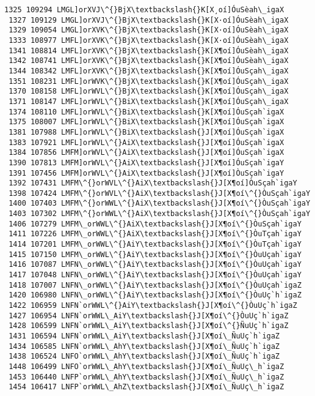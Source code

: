 \documentclass[11pt]{article}
\begin{document}
\begin{Verbatim}[commandchars=\\\{\}]
 1325 109294 LMGL]orXVJ\^{}BjX\textbackslash{}K[X¸oí]ÓuSèah\_igaX
 1327 109129 LMGL]orXVJ\^{}BjX\textbackslash{}K[X·oí]ÓuSèah\_igaX
 1329 109054 LMGL]orXVK\^{}BjX\textbackslash{}K[X·oí]ÓuSèah\_igaX
 1333 108977 LMFL]orXVK\^{}BjX\textbackslash{}K[X·oí]ÓuSèah\_igaX
 1341 108814 LMFL]orXVK\^{}BjX\textbackslash{}K[X¶oí]ÓuSèah\_igaX
 1342 108741 LMFL]orXVK\^{}BjX\textbackslash{}K[X¶oí]ÓuSèah\_igaX
 1344 108342 LMFL]orXVK\^{}BjX\textbackslash{}K[X¶oí]ÓuSçah\_igaX
 1351 108231 LMFL]orWVK\^{}BjX\textbackslash{}K[X¶oí]ÓuSçah\_igaX
 1370 108158 LMFL]orWVL\^{}BjX\textbackslash{}K[X¶oí]ÓuSçah\_igaX
 1371 108147 LMFL]orWVL\^{}BiX\textbackslash{}K[X¶oí]ÓuSçah\_igaX
 1374 108110 LMFL]orWVL\^{}BiX\textbackslash{}K[X¶oí]ÓuSçah`igaX
 1375 108007 LMFL]orWVL\^{}BiX\textbackslash{}K[X¶oí]ÓuSçah`igaX
 1381 107988 LMFL]orWVL\^{}BiX\textbackslash{}J[X¶oí]ÓuSçah`igaX
 1383 107921 LMFL]orWVL\^{}AiX\textbackslash{}J[X¶oí]ÓuSçah`igaX
 1384 107856 LMFM]orWVL\^{}AiX\textbackslash{}J[X¶oí]ÓuSçah`igaX
 1390 107813 LMFM]orWVL\^{}AiX\textbackslash{}J[X¶oí]ÓuSçah`igaY
 1391 107456 LMFM]orWVL\^{}AiX\textbackslash{}J[X¶oí]ÒuSçah`igaY
 1392 107431 LMFM\^{}orWVL\^{}AiX\textbackslash{}J[X¶oí]ÒuSçah`igaY
 1398 107424 LMFM\^{}orWVL\^{}AiX\textbackslash{}J[X¶oí\^{}ÒuSçah`igaY
 1400 107403 LMFM\^{}orWWL\^{}AiX\textbackslash{}J[X¶oí\^{}ÒuSçah`igaY
 1403 107302 LMFM\^{}orWWL\^{}AiX\textbackslash{}J[X¶oí\^{}ÒuSçah`igaY
 1406 107279 LMFM\_orWWL\^{}AiX\textbackslash{}J[X¶oí\^{}ÒuSçah`igaY
 1411 107226 LMFM\_orWWL\^{}AiX\textbackslash{}J[X¶oí\^{}ÒuTçah`igaY
 1414 107201 LMFM\_orWWL\^{}AiY\textbackslash{}J[X¶oí\^{}ÒuTçah`igaY
 1415 107150 LMFM\_orWWL\^{}AiY\textbackslash{}J[X¶oí\^{}ÒuUçah`igaY
 1416 107087 LMFN\_orWWL\^{}AiY\textbackslash{}J[X¶oí\^{}ÒuUçah`igaY
 1417 107048 LNFN\_orWWL\^{}AiY\textbackslash{}J[X¶oí\^{}ÒuUçah`igaY
 1418 107007 LNFN\_orWWL\^{}AiY\textbackslash{}J[X¶oí\^{}ÒuUçah`igaZ
 1420 106980 LNFN\_orWWL\^{}AiY\textbackslash{}J[X¶oí\^{}ÒuUç`h`igaZ
 1422 106959 LNFN`orWWL\^{}AiY\textbackslash{}J[X¶oí\^{}ÒuUç`h`igaZ
 1427 106954 LNFN`orWWL\_AiY\textbackslash{}J[X¶oí\^{}ÒuUç`h`igaZ
 1428 106599 LNFN`orWWL\_AiY\textbackslash{}J[X¶oí\^{}ÑuUç`h`igaZ
 1431 106594 LNFN`orWWL\_AiY\textbackslash{}J[X¶oí\_ÑuUç`h`igaZ
 1434 106585 LNFN`orWWL\_AhY\textbackslash{}J[X¶oí\_ÑuUç`h`igaZ
 1438 106524 LNFO`orWWL\_AhY\textbackslash{}J[X¶oí\_ÑuUç`h`igaZ
 1448 106499 LNFO`orWWL\_AhY\textbackslash{}J[X¶oí\_ÑuUç\_h`igaZ
 1453 106440 LNFP`orWWL\_AhY\textbackslash{}J[X¶oí\_ÑuUç\_h`igaZ
 1454 106417 LNFP`orWWL\_AhZ\textbackslash{}J[X¶oí\_ÑuUç\_h`igaZ

\end{Verbatim}
\end{document}

